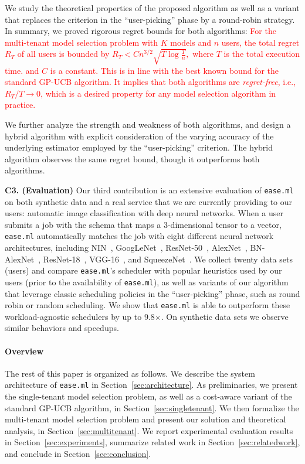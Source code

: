 \documentclass[letterpaper]{vldb}
\newcommand{\eml}{\texttt{ease.ml}\xspace}
\begin{document}
We study the theoretical properties of the proposed algorithm as well as a variant that replaces the criterion in the ``user-picking'' phase by a round-robin strategy.
In summary, we proved rigorous regret bounds for both algorithms: \textcolor{red}{For the multi-tenant model selection problem 
with $K$ models and $n$ users, 
the total regret $R_T$ of all users is bounded by 
$
R_T < C n^{3/2}\sqrt{T\log \frac{T}{n}}, 
$
where $T$ is the total execution time.
and $C$ is a constant.
This is in line with the best known bound for the standard GP-UCB algorithm.
It implies that both algorithms are \emph{regret-free}, i.e., $R_T/T \rightarrow 0$, which is a desired property for any model selection algorithm in practice.
}

We further analyze the strength and weakness of both algorithms, and design a hybrid algorithm with explicit consideration
of the varying accuracy of the underlying estimator employed by the ``user-picking'' criterion.
The hybrid algorithm observes the same regret bound, though it outperforms both algorithms.


\vspace{0.5em}
\noindent
{\bf C3. (Evaluation)} Our third contribution is an extensive
evaluation of \eml on both synthetic data and a real service that we are currently providing to our users: automatic image classification 
with deep neural networks.
When a user submits a job with the schema
that maps a 3-dimensional tensor to
a vector, \eml automatically matches the job with eight
different neural network architectures, including
NIN~\cite{XXX}, GoogLeNet~\cite{XXX}, ResNet-50~\cite{XXX}, AlexNet~\cite{XXX},
BN-AlexNet~\cite{XXX}, ResNet-18~\cite{XXX}, VGG-16~\cite{XXX},
and SqueezeNet~\cite{XXX}. We collect twenty 
data sets (users) and compare
\eml's scheduler with popular heuristics 
used by our users (prior to the availability of \eml), as well as variants of our algorithm that leverage classic scheduling policies in the ``user-picking'' phase, such as round robin or random scheduling.
We show that \eml is able to outperform
these workload-agnostic schedulers
by up to 9.8$\times$. On synthetic data sets
we observe similar behaviors and speedups.

\vspace{-1em}
\paragraph*{Overview}
The rest of this paper is organized as follows.
We describe the system architecture of \eml in Section~\ref{sec:architecture}.
As preliminaries, we present the single-tenant model selection problem, as well as a cost-aware variant of the standard GP-UCB algorithm, in Section~\ref{sec:singletenant}.
We then formalize the multi-tenant model selection problem and present our solution and theoretical analysis, in Section~\ref{sec:multitenant}.
We report experimental evaluation results in Section~\ref{sec:experiments}, summarize related work in Section~\ref{sec:relatedwork}, and conclude in Section~\ref{sec:conclusion}.
\end{document}
